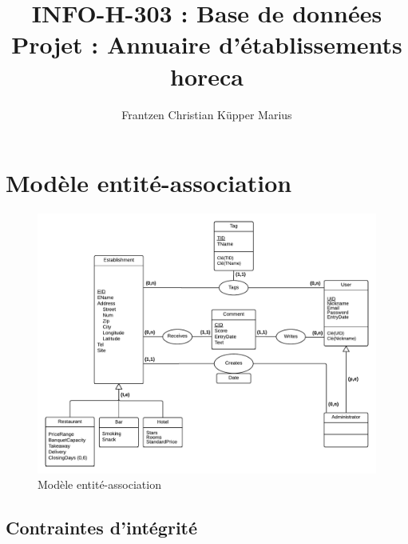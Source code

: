 \documentclass[11pt,a4paper]{report}
\author{Frantzen Christian Küpper Marius}
\title{INFO-H-303 : Base de données\\
		Projet : Annuaire d'établissements horeca}
\begin{document}
\maketitle
\section*{Modèle entité-association}

\begin{figure}[h]
  \centering
  \includegraphics[width=\textwidth]{modelEA.pdf}
  \caption{Modèle entité-association}
\end{figure}


\subsection*{Contraintes d'intégrité}
\end{document}
